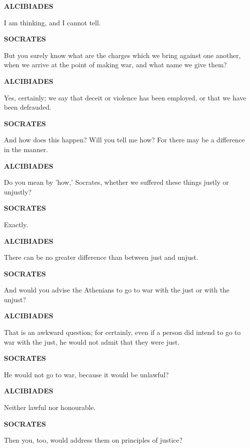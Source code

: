 \documentclass[11pt,letter]{article}
\begin{document}
\par \textbf{ALCIBIADES}
\par   I am thinking, and I cannot tell.

\par \textbf{SOCRATES}
\par   But you surely know what are the charges which we bring against one another, when we arrive at the point of making war, and what name we give them?

\par \textbf{ALCIBIADES}
\par   Yes, certainly; we say that deceit or violence has been employed, or that we have been defrauded.

\par \textbf{SOCRATES}
\par   And how does this happen? Will you tell me how? For there may be a difference in the manner.

\par \textbf{ALCIBIADES}
\par   Do you mean by 'how,' Socrates, whether we suffered these things justly or unjustly?

\par \textbf{SOCRATES}
\par   Exactly.

\par \textbf{ALCIBIADES}
\par   There can be no greater difference than between just and unjust.

\par \textbf{SOCRATES}
\par   And would you advise the Athenians to go to war with the just or with the unjust?

\par \textbf{ALCIBIADES}
\par   That is an awkward question; for certainly, even if a person did intend to go to war with the just, he would not admit that they were just.

\par \textbf{SOCRATES}
\par   He would not go to war, because it would be unlawful?

\par \textbf{ALCIBIADES}
\par   Neither lawful nor honourable.

\par \textbf{SOCRATES}
\par   Then you, too, would address them on principles of justice?
\end{document}
